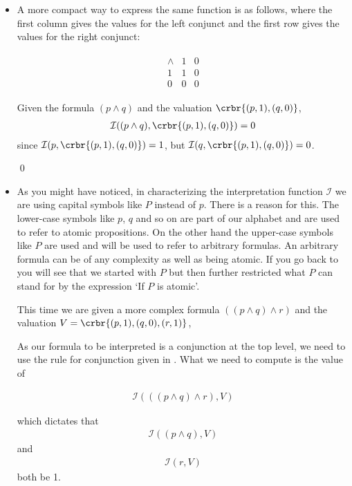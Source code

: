 \documentclass[11pt]{article}
\begin{document}
\begin{itemize}
\item A more compact way to express the same function is as follows, where the first column
gives the values for the left conjunct and the first row gives the values for
the right conjunct:

\begin{align}
\begin{array}{c|cc}
\land & 1 & 0 \\ \hline
1 &1 &0 \\
0 &0 &0  
\end{array}
\end{align}

\hrulefill
\begin{uexample}\label{exconj1}
Given the formula $(p\land q)$ and the valuation $\crbr{(p,1),(q,0)}$,
\begin{align}
\mathcal{I}((p\land q), \crbr{(p,1),(q,0)}) = 0 
\end{align}
since $\mathcal{I}(p,\crbr{(p,1),(q,0)}) = 1$, but
$\mathcal{I}(q,\crbr{(p,1),(q,0)}) = 0$.

\qed
\end{uexample}
\hrulefill

\item As you might have noticed, in characterizing the interpretation function
$\mathcal{I}$ we are using capital symbols like $P$ instead of $p$. There is a
reason for this. The lower-case symbols like $p$, $q$ and so on are part of our
alphabet and are used to refer to atomic propositions. On the other hand the
upper-case symbols like $P$ are used and will be used to refer to arbitrary
formulas. An arbitrary formula can be of any complexity as well as being atomic.
If you go back to  you will see that we started with $P$ but then
further restricted what $P$ can stand for by the expression `If $P$ is atomic'.

\hrulefill
\begin{uexample}\label{exconj2}
This time we are given a more complex formula $((p\land q)\land r)$ and the
valuation $V=\crbr{(p,1),(q,0),(r,1)}$,

As our formula to be interpreted is a conjunction at the top level, we need to
use the rule for conjunction given in . What we need to compute is
the value of 

\begin{align}\label{a0}
\mathcal{I}(((p\land q)\land r), V) 
\end{align}

which dictates that 
\begin{align}\label{a1}
\mathcal{I}((p\land q), V) 
\end{align}
and 
\begin{align}\label{a2}
\mathcal{I}(r, V) 
\end{align}
both be 1.


\end{uexample}
\end{itemize}
\end{document}
